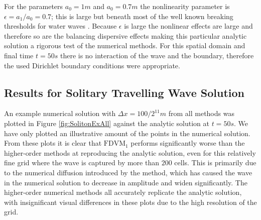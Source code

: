 For the parameters $a_0 = 1m$ and $a_0 = 0.7m$ the nonlinearity parameter is $\epsilon = a_1 / a_0 = 0.7$; this is large but beneath most of the well known breaking thresholds for water waves \cite{Ippen-Kulin-1954-4}. Because $\epsilon$ is large the nonlinear effects are large and therefore so are the balancing dispersive effects making this particular analytic solution a rigorous test of the numerical methods. For this spatial domain and final time $t=50s$ there is no interaction of the wave and the boundary, therefore the used Dirichlet boundary conditions were appropriate.

\subsection{Results for Solitary Travelling Wave Solution}
An example numerical solution with $\Delta x = {100} / {2^{11}}m$ from all methods was plotted in Figure \ref{fig:SolitonExAll} against the analytic solution at $t= 50s$. We have only plotted an illustrative amount of the points in the numerical solution. From these plots it is clear that $\text{FDVM}_1$ performs significantly worse than the higher-order methods at reproducing the analytic solution, even for this relatively fine grid where the wave is captured by more than $200$ cells. This is primarily due to the numerical diffusion introduced by the method, which has caused the wave in the numerical solution to decrease in amplitude and widen significantly. The higher-order numerical methods all accurately replicate the analytic solution, with insignificant visual differences in these plots due to the high resolution of the grid.

